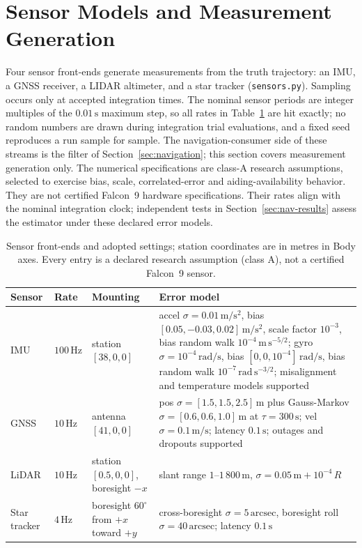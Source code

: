 \section{Sensor Models and Measurement Generation}
\label{sec:sensors}

Four sensor front-ends generate measurements from the truth trajectory:
an \ac{IMU}, a \ac{GNSS} receiver, a \ac{LIDAR} altimeter, and a star
tracker (\texttt{sensors.py}). Sampling occurs only at accepted
integration times. The nominal sensor periods are integer multiples of the $0.01\,\mathrm{s}$ maximum step, so all rates in Table~\ref{tab:sensors} are hit
exactly; no random numbers are drawn during integration trial
evaluations, and a fixed seed reproduces a run sample for sample. The
navigation-consumer side of these streams is the filter of
Section~\ref{sec:navigation}; this section covers measurement generation
only. The numerical specifications are class-A research assumptions, selected to exercise bias, scale, correlated-error and aiding-availability behavior. They are not certified Falcon~9 hardware specifications. Their rates align with the nominal integration clock; independent tests in Section~\ref{sec:nav-results} assess the estimator under these declared error models.

\begin{table}[htbp]
\centering
\begin{tabular}{lllp{6.6cm}}
\toprule
Sensor & Rate & Mounting & Error model \\
\midrule
IMU & $100\,\mathrm{Hz}$ & station $[38,0,0]$ &
accel $\sigma = 0.01\,\mathrm{m/s^2}$, bias $[0.05,-0.03,0.02]\,\mathrm{m/s^2}$,
scale factor $10^{-3}$, bias random walk $10^{-4}\,\mathrm{m\,s^{-5/2}}$;
gyro $\sigma = 10^{-4}\,\mathrm{rad/s}$, bias $[0,0,10^{-4}]\,\mathrm{rad/s}$, bias random walk $10^{-7}\,\mathrm{rad\,s^{-3/2}}$;
misalignment and temperature models supported \\
GNSS & $10\,\mathrm{Hz}$ & antenna $[41,0,0]$ &
pos $\sigma = [1.5, 1.5, 2.5]\,\mathrm{m}$ plus Gauss-Markov
$\sigma = [0.6, 0.6, 1.0]\,\mathrm{m}$ at $\tau = 300\,\mathrm{s}$;
vel $\sigma = 0.1\,\mathrm{m/s}$;
latency $0.1\,\mathrm{s}$; outages and dropouts supported \\
LiDAR & $10\,\mathrm{Hz}$ & station $[0.5,0,0]$, boresight $-x$ &
slant range $1$--$1\,800\,\mathrm{m}$,
$\sigma = 0.05\,\mathrm{m} + 10^{-4}\,R$ \\
Star tracker & $4\,\mathrm{Hz}$ & boresight $60^{\circ}$ from $+x$ toward $+y$ &
cross-boresight $\sigma = 5\,\mathrm{arcsec}$, boresight roll
$\sigma = 40\,\mathrm{arcsec}$; latency $0.1\,\mathrm{s}$ \\
\bottomrule
\end{tabular}
\caption{Sensor front-ends and adopted settings; station coordinates are in metres in Body axes. Every entry is a declared research assumption (class A),
not a certified Falcon~9 sensor.}
\label{tab:sensors}
\end{table}


